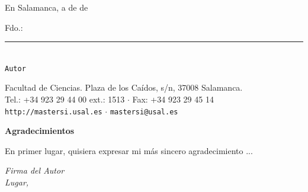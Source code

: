 \documentclass[12pt,a4paper,spanish,twoside]{article}
\begin{document}
\vspace{0.5cm}

\noindent En Salamanca, a \underline{\hspace{1.5cm}} de \underline{\hspace{4cm}} de \underline{\hspace{1.5cm}}

\vspace{1cm}

\noindent Fdo.: \rule{8cm}{0.4pt}\\[0.3cm]
\hspace*{1.5cm} \texttt{Autor}

\vfill
\begin{center}
    \footnotesize
    Facultad de Ciencias. Plaza de los Caídos, s/n, 37008 Salamanca.\\
    Tel.: +34 923 29 44 00 ext.: 1513 $\cdot$ Fax: +34 923 29 45 14\\
    \texttt{http://mastersi.usal.es} $\cdot$ \texttt{mastersi@usal.es}
\end{center}

\newpage
\thispagestyle{empty}

\vspace*{0.5cm}
    \begin{center}
        {\bf Agradecimientos}
    \end{center}
\vspace{0.5cm}

En primer lugar, quisiera expresar mi más sincero agradecimiento ...


\vfill
\begin{flushright}
    \textit{Firma del Autor}\\
    \textit{Lugar, \the\year}
\end{flushright}


\newpage
\renewcommand{\thepage}{\roman{page}}
\setcounter{page}{1}
\pagestyle{fancy}
\fancyhf{}
\fancyfoot[LE,RO]{\textbf{\thepage}}
\renewcommand{\headrulewidth}{0.0pt}
\renewcommand{\footrulewidth}{0.4pt}
\end{document}
